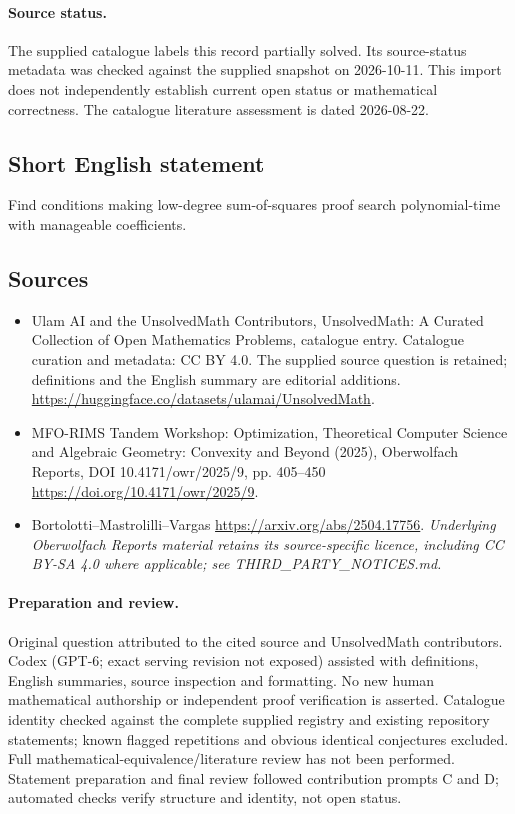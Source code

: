 \documentclass[11pt]{article}
\begin{document}
\paragraph{Source status.}
The supplied catalogue labels this record partially solved. Its source-status metadata was checked against the supplied snapshot on 2026-10-11. This import does not independently establish current open status or mathematical correctness. The catalogue literature assessment is dated 2026-08-22.
\subsection{Short English statement}
Find conditions making low-degree sum-of-squares proof search polynomial-time with manageable coefficients.
\subsection{Sources}
\begin{itemize}
\item[\hypertarget{source:statement:1}{S1}] Ulam AI and the UnsolvedMath Contributors, UnsolvedMath: A Curated Collection of Open Mathematics Problems, catalogue entry. Catalogue curation and metadata: CC BY 4.0. The supplied source question is retained; definitions and the English summary are editorial additions.
\url{https://huggingface.co/datasets/ulamai/UnsolvedMath}.
\item[\hypertarget{source:statement:2}{S2}] MFO-RIMS Tandem Workshop: Optimization, Theoretical Computer Science and Algebraic Geometry: Convexity and Beyond (2025), Oberwolfach Reports, DOI 10.4171/owr/2025/9, pp. 405--450
\url{https://doi.org/10.4171/owr/2025/9}.
\item[\hypertarget{source:statement:3}{S3}] Bortolotti--Mastrolilli--Vargas
\url{https://arxiv.org/abs/2504.17756}.
\textit{Underlying Oberwolfach Reports material retains its source-specific licence, including CC BY-SA 4.0 where applicable; see THIRD\_PARTY\_NOTICES.md.}
\end{itemize}
\paragraph{Preparation and review.}
Original question attributed to the cited source and UnsolvedMath contributors. Codex (GPT-6; exact serving revision not exposed) assisted with definitions, English summaries, source inspection and formatting. No new human mathematical authorship or independent proof verification is asserted. Catalogue identity checked against the complete supplied registry and existing repository statements; known flagged repetitions and obvious identical conjectures excluded. Full mathematical-equivalence/literature review has not been performed. Statement preparation and final review followed contribution prompts C and D; automated checks verify structure and identity, not open status.
\label{end:statement}
\end{document}
